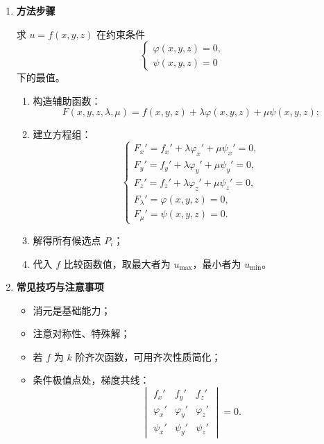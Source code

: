 \begin{enumerate}
    \item \textbf{方法步骤}

          求 $u = f(x, y, z)$ 在约束条件
          \[
              \begin{cases}
                  \varphi(x, y, z) = 0, \\
                  \psi(x, y, z) = 0
              \end{cases}
          \]
          下的最值。

          \begin{enumerate}
              \item 构造辅助函数：
                    \[
                        F(x, y, z, \lambda, \mu)
                        = f(x, y, z) + \lambda \varphi(x, y, z) + \mu \psi(x, y, z);
                    \]
              \item 建立方程组：
                    \[
                        \begin{cases}
                            F_x' = f_x' + \lambda \varphi_x' + \mu \psi_x' = 0, \\
                            F_y' = f_y' + \lambda \varphi_y' + \mu \psi_y' = 0, \\
                            F_z' = f_z' + \lambda \varphi_z' + \mu \psi_z' = 0, \\
                            F_\lambda' = \varphi(x, y, z) = 0,                  \\
                            F_\mu' = \psi(x, y, z) = 0.
                        \end{cases}
                    \]
              \item 解得所有候选点 $P_i$；
              \item 代入 $f$ 比较函数值，取最大者为 $u_{\max}$，最小者为 $u_{\min}$。
          \end{enumerate}

    \item \textbf{常见技巧与注意事项}

          \begin{itemize}
              \item 消元是基础能力；
              \item 注意对称性、特殊解；
              \item 若 $f$ 为 $k$ 阶齐次函数，可用齐次性质简化；
              \item 条件极值点处，梯度共线：
                    \[
                        \begin{vmatrix}
                            f_x'       & f_y'       & f_z'       \\
                            \varphi_x' & \varphi_y' & \varphi_z' \\
                            \psi_x'    & \psi_y'    & \psi_z'
                        \end{vmatrix}
                        = 0.
                    \]
          \end{itemize}
\end{enumerate}

